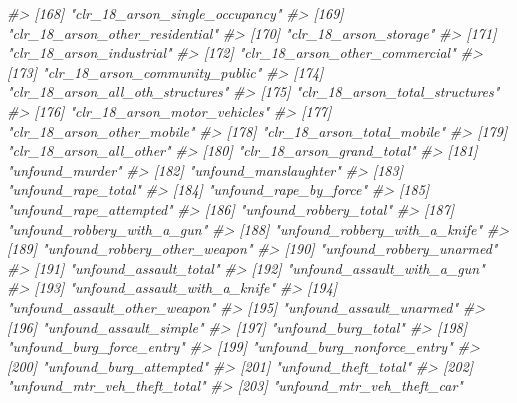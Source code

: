 \documentclass[
]{krantz}
\makeatletter
\newenvironment{Shaded}{\begin{snugshade}}{\end{snugshade}}
\newcommand{\CommentTok}[1]{\textcolor[rgb]{0.37,0.37,0.37}{\textit{#1}}}
\newenvironment{kframe}{%
\medskip{}
\setlength{\fboxsep}{.8em}
 \def\at@end@of@kframe{}%
 \ifinner\ifhmode%
  \def\at@end@of@kframe{\end{minipage}}%
  \begin{minipage}{\columnwidth}%
 \fi\fi%
 \def\FrameCommand##1{\hskip\@totalleftmargin \hskip-\fboxsep
 \colorbox{shadecolor}{##1}\hskip-\fboxsep
     \hskip-\linewidth \hskip-\@totalleftmargin \hskip\columnwidth}%
 \MakeFramed {\advance\hsize-\width
   \@totalleftmargin\z@ \linewidth\hsize
   \@setminipage}}%
 {\par\unskip\endMakeFramed%
 \at@end@of@kframe}
\renewenvironment{Shaded}{\begin{kframe}}{\end{kframe}}
\makeatother
\begin{document}
\begin{Shaded}
\begin{Highlighting}[]
\CommentTok{\#\textgreater{} [168] "clr\_18\_arson\_single\_occupancy"   }
\CommentTok{\#\textgreater{} [169] "clr\_18\_arson\_other\_residential"  }
\CommentTok{\#\textgreater{} [170] "clr\_18\_arson\_storage"            }
\CommentTok{\#\textgreater{} [171] "clr\_18\_arson\_industrial"         }
\CommentTok{\#\textgreater{} [172] "clr\_18\_arson\_other\_commercial"   }
\CommentTok{\#\textgreater{} [173] "clr\_18\_arson\_community\_public"   }
\CommentTok{\#\textgreater{} [174] "clr\_18\_arson\_all\_oth\_structures" }
\CommentTok{\#\textgreater{} [175] "clr\_18\_arson\_total\_structures"   }
\CommentTok{\#\textgreater{} [176] "clr\_18\_arson\_motor\_vehicles"     }
\CommentTok{\#\textgreater{} [177] "clr\_18\_arson\_other\_mobile"       }
\CommentTok{\#\textgreater{} [178] "clr\_18\_arson\_total\_mobile"       }
\CommentTok{\#\textgreater{} [179] "clr\_18\_arson\_all\_other"          }
\CommentTok{\#\textgreater{} [180] "clr\_18\_arson\_grand\_total"        }
\CommentTok{\#\textgreater{} [181] "unfound\_murder"                  }
\CommentTok{\#\textgreater{} [182] "unfound\_manslaughter"            }
\CommentTok{\#\textgreater{} [183] "unfound\_rape\_total"              }
\CommentTok{\#\textgreater{} [184] "unfound\_rape\_by\_force"           }
\CommentTok{\#\textgreater{} [185] "unfound\_rape\_attempted"          }
\CommentTok{\#\textgreater{} [186] "unfound\_robbery\_total"           }
\CommentTok{\#\textgreater{} [187] "unfound\_robbery\_with\_a\_gun"      }
\CommentTok{\#\textgreater{} [188] "unfound\_robbery\_with\_a\_knife"    }
\CommentTok{\#\textgreater{} [189] "unfound\_robbery\_other\_weapon"    }
\CommentTok{\#\textgreater{} [190] "unfound\_robbery\_unarmed"         }
\CommentTok{\#\textgreater{} [191] "unfound\_assault\_total"           }
\CommentTok{\#\textgreater{} [192] "unfound\_assault\_with\_a\_gun"      }
\CommentTok{\#\textgreater{} [193] "unfound\_assault\_with\_a\_knife"    }
\CommentTok{\#\textgreater{} [194] "unfound\_assault\_other\_weapon"    }
\CommentTok{\#\textgreater{} [195] "unfound\_assault\_unarmed"         }
\CommentTok{\#\textgreater{} [196] "unfound\_assault\_simple"          }
\CommentTok{\#\textgreater{} [197] "unfound\_burg\_total"              }
\CommentTok{\#\textgreater{} [198] "unfound\_burg\_force\_entry"        }
\CommentTok{\#\textgreater{} [199] "unfound\_burg\_nonforce\_entry"     }
\CommentTok{\#\textgreater{} [200] "unfound\_burg\_attempted"          }
\CommentTok{\#\textgreater{} [201] "unfound\_theft\_total"             }
\CommentTok{\#\textgreater{} [202] "unfound\_mtr\_veh\_theft\_total"     }
\CommentTok{\#\textgreater{} [203] "unfound\_mtr\_veh\_theft\_car"       }

\end{Highlighting}
\end{Shaded}
\end{document}
